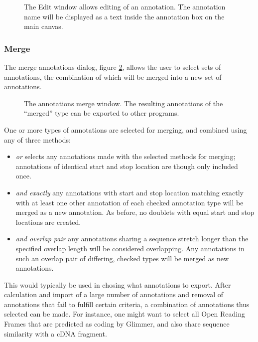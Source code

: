 \begin{figure}[htbp]
	\begin{center}
	\end{center}
\caption{The Edit window allows editing of an annotation. The annotation name will be displayed as a text inside the annotation box on the main canvas.}
\label{fig:GUIedit}
\end{figure}

\subsubsection{Merge}

The merge annotations dialog, figure \ref{fig:GUImerge}, allows the user to select sets of
annotations, the combination of which will be merged into a new set of
annotations.

\begin{figure}[htbp]
	\begin{center}
	\end{center}
\caption{The annotations merge window. The resulting annotations of the ``merged'' type can be exported to other programs.}
\label{fig:GUImerge}
\end{figure}

One or more types of annotations are selected for merging, and
combined using any of three methods:
\begin{itemize} 
\item{\textit{or}} selects any annotations made with the selected methods for
merging; annotations of identical start and stop location are though
only included once.
\item{\textit{and exactly}} any annotations with start and stop location
matching exactly with at least one other annotation of each checked
annotation type will be merged as a new annotation. As before, no
doublets with equal start and stop locations are created.
\item{\textit{and overlap pair}} any annotations sharing a sequence stretch
longer than the specified overlap length will be considered overlapping. 
Any annotations in such an overlap pair of differing, checked types will be
merged as new annotations.
\end{itemize}

This would typically be used in chosing what annotations to export.
After calculation and import of a large number of annotations and
removal of annotations that fail to fulfill certain criteria, a
combination of annotations thus selected can be made. For instance,
one might want to select all Open Reading Frames that are predicted as
coding by Glimmer, and also share sequence similarity with a cDNA fragment.

